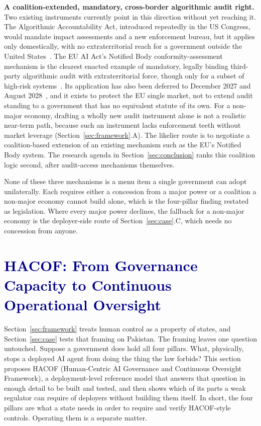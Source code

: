 \documentclass[journal]{IEEEtran}
\newcommand{\hacof}{HACOF}
\begin{document}
\textbf{A coalition-extended, mandatory, cross-border algorithmic audit right.} Two existing instruments currently point in this direction without yet reaching it. The Algorithmic Accountability Act, introduced repeatedly in the US Congress, would mandate impact assessments and a new enforcement bureau, but it applies only domestically, with no extraterritorial reach for a government outside the United States~\cite{wyden2023algorithmic}. The EU AI Act's Notified Body conformity-assessment mechanism is the clearest enacted example of mandatory, legally binding third-party algorithmic audit with extraterritorial force, though only for a subset of high-risk systems~\cite{euaiact2024}. Its application has also been deferred to December 2027 and August 2028~\cite{euaiomnibus2026}, and it exists to protect the EU single market, not to extend audit standing to a government that has no equivalent statute of its own. For a non-major economy, drafting a wholly new audit instrument alone is not a realistic near-term path, because such an instrument lacks enforcement teeth without market leverage (Section~\ref{sec:framework}.A). The likelier route is to negotiate a coalition-based extension of an existing mechanism such as the EU's Notified Body system. The research agenda in Section~\ref{sec:conclusion} ranks this coalition logic second, after audit-access mechanisms themselves.

None of these three mechanisms is a menu item a single government can adopt unilaterally. Each requires either a concession from a major power or a coalition a non-major economy cannot build alone, which is the four-pillar finding restated as legislation. Where every major power declines, the fallback for a non-major economy is the deployer-side route of Section~\ref{sec:case}.C, which needs no concession from anyone.

\section{\textcolor{darkblue}{\hacof: From Governance Capacity to Continuous Operational Oversight}}
\label{sec:hacof}

Section~\ref{sec:framework} treats human control as a property of states, and Section~\ref{sec:case} tests that framing on Pakistan. The framing leaves one question untouched. Suppose a government does hold all four pillars. What, physically, stops a deployed AI agent from doing the thing the law forbids? This section proposes \hacof{} (Human-Centric AI Governance and Continuous Oversight Framework), a deployment-level reference model that answers that question in enough detail to be built and tested, and then shows which of its parts a weak regulator can require of deployers without building them itself. In short, the four pillars are what a state needs in order to require and verify \hacof-style controls. Operating them is a separate matter.
\end{document}
